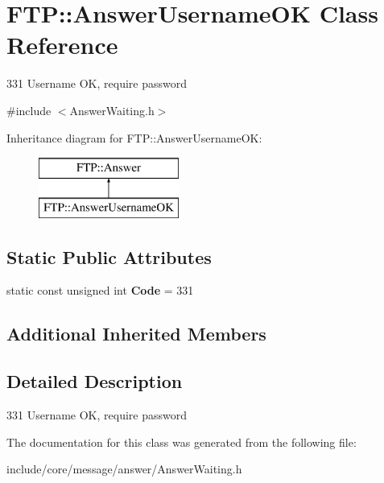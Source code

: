 \hypertarget{class_f_t_p_1_1_answer_username_o_k}{\section{F\-T\-P\-:\-:Answer\-Username\-O\-K Class Reference}
\label{class_f_t_p_1_1_answer_username_o_k}
}


331 Username O\-K, require password  




{\ttfamily \#include $<$Answer\-Waiting.\-h$>$}

Inheritance diagram for F\-T\-P\-:\-:Answer\-Username\-O\-K\-:\begin{figure}[H]
\begin{center}
\leavevmode
\includegraphics[height=2.000000cm]{class_f_t_p_1_1_answer_username_o_k}
\end{center}
\end{figure}
\subsection*{Static Public Attributes}
\begin{DoxyCompactItemize}
\item 
\hypertarget{class_f_t_p_1_1_answer_username_o_k_a2a86e76b47c5d49f642a73173b36a7b1}{static const unsigned int {\bfseries Code} = 331}\label{class_f_t_p_1_1_answer_username_o_k_a2a86e76b47c5d49f642a73173b36a7b1}

\end{DoxyCompactItemize}
\subsection*{Additional Inherited Members}


\subsection{Detailed Description}
331 Username O\-K, require password 

The documentation for this class was generated from the following file\-:\begin{DoxyCompactItemize}
\item 
include/core/message/answer/Answer\-Waiting.\-h\end{DoxyCompactItemize}
